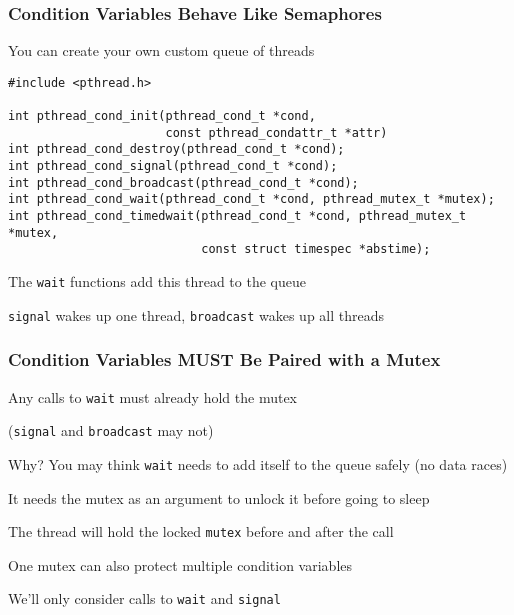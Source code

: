   \begin{frame}[fragile]
    \frametitle{Condition Variables Behave Like Semaphores}

    You can create your own custom queue of threads

    \vspace{2em}

    \begin{lstlisting}
#include <pthread.h>

int pthread_cond_init(pthread_cond_t *cond,
                      const pthread_condattr_t *attr)
int pthread_cond_destroy(pthread_cond_t *cond);
int pthread_cond_signal(pthread_cond_t *cond);
int pthread_cond_broadcast(pthread_cond_t *cond);
int pthread_cond_wait(pthread_cond_t *cond, pthread_mutex_t *mutex);
int pthread_cond_timedwait(pthread_cond_t *cond, pthread_mutex_t *mutex,
                           const struct timespec *abstime);
    \end{lstlisting}

    \vspace{2em}

    The \texttt{wait} functions add this thread to the queue

    \hspace{2em} \texttt{signal} wakes up one thread, \texttt{broadcast} wakes
    up all threads
  \end{frame}

  \begin{frame}
    \frametitle{Condition Variables MUST Be Paired with a Mutex}

    Any calls to \texttt{wait} must already hold the mutex

    \hspace{2em} (\texttt{signal} and \texttt{broadcast} may not)

    \vspace{2em}

    Why? You may think \texttt{wait} needs to add itself to the queue safely (no
    data races)

    \hspace{2em} It needs the mutex as an argument to unlock it before going to
    sleep

    \hspace{4em} The thread will hold the locked \texttt{mutex} before and after
    the call

    \vspace{2em}

    One mutex can also protect multiple condition variables

    \vspace{2em}

    We'll only consider calls to \texttt{wait} and \texttt{signal}
  \end{frame}

